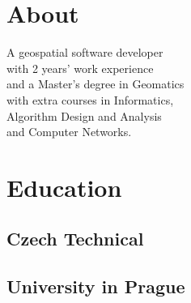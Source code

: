 \documentclass[letterpaper]{deedy-resume} %
\begin{document}
\begin{minipage}[t]{0.33\textwidth} %


\section{About} 

A geospatial software developer \\ 
with 2 years' work experience \\ 
and a Master's degree in Geomatics \\ 
with extra courses in Informatics, \\ 
Algorithm Design and Analysis \\
and Computer Networks.

\sectionspace %



\section{Education} 

\subsection{Czech Technical}
\subsection{University in Prague}


\sectionspace %



\sectionspace %


%
%


\end{minipage}
\end{document}
